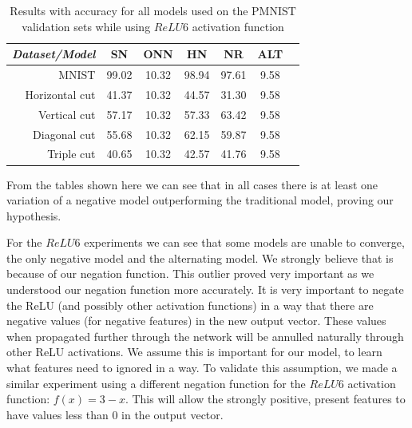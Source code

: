 \documentclass[b5paper]{book}
\begin{document}
\begin{table}[ht]
  \centering
  \begin{tabular}{rS[table-format=2.1]S[table-format=2.1]S[table-format=2.1]S[table-format=2.1]S[table-format=2.1]S[table-format=2.1]}
    \toprule
     \textit{Dataset/Model} & SN & ONN & HN & NR & ALT \\
    \midrule
    {MNIST} & {99.02} & {10.32} & {98.94} & {97.61} & {9.58} \\
    {Horizontal cut} & {41.37} & {10.32} & {44.57} & {31.30} & {9.58} \\
    {Vertical cut} & {57.17} & {10.32} & {57.33} & {63.42} & {9.58} \\
    {Diagonal cut} & {55.68} & {10.32} & {62.15} & {59.87} & {9.58} \\
    {Triple cut} & {40.65} & {10.32} & {42.57} & {41.76} & {9.58} \\
    
    \bottomrule
  \end{tabular}
  \caption{Results with accuracy for all models used on the PMNIST validation sets while using \( ReLU6 \) activation function}
  \label{tab:results-relu6}
\end{table} 

From the tables shown here we can see that in all cases there is at least one variation of a negative model outperforming the traditional model, proving our hypothesis.

For the \( ReLU6 \) experiments we can see that some models are unable to converge, the only negative model and the alternating model. We strongly believe that is because of our negation function. This outlier proved very important as we understood our negation function more accurately. It is very important to negate the ReLU (and possibly other activation functions) in a way that there are negative values (for negative features) in the new output vector. These values when propagated further through the network will be annulled naturally through other ReLU activations. We assume this is important for our model, to learn what features need to ignored in a way. To validate this assumption, we made a similar experiment using a different negation function for the \( ReLU6 \) activation function:  \( f(x) = 3 - x \). This will allow the strongly positive, present features to have values less than 0 in the output vector.
\end{document}
